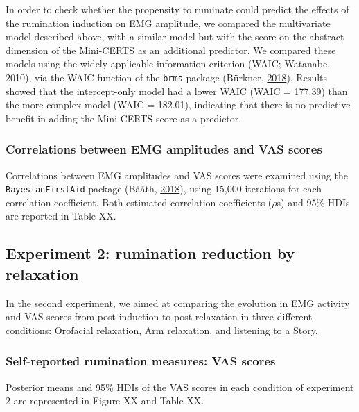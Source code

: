 \documentclass[a4paper,12pt,twoside,openright,oldfontcommands]{memoir}
\begin{document}
In order to check whether the propensity to ruminate could predict the effects of the rumination induction on EMG amplitude, we compared the multivariate model described above, with a similar model but with the score on the abstract dimension of the Mini-CERTS as an additional predictor. We compared these models using the widely applicable information criterion (WAIC; Watanabe, 2010), via the WAIC function of the \texttt{brms} package (Bürkner, \protect\hyperlink{ref-R-brms}{2018}). Results showed that the intercept-only model had a lower WAIC (WAIC = 177.39) than the more complex model (WAIC = 182.01), indicating that there is no predictive benefit in adding the Mini-CERTS score as a predictor.

\hypertarget{correlations-between-emg-amplitudes-and-vas-scores}{%
\subsubsection{Correlations between EMG amplitudes and VAS scores}\label{correlations-between-emg-amplitudes-and-vas-scores}}

Correlations between EMG amplitudes and VAS scores were examined using the \texttt{BayesianFirstAid} package (Bååth, \protect\hyperlink{ref-R-BayesianFirstAid}{2018}), using 15,000 iterations for each correlation coefficient. Both estimated correlation coefficients (\(\rho\)s) and 95\% HDIs are reported in Table XX.

\hypertarget{experiment-2-rumination-reduction-by-relaxation-1}{%
\subsection{Experiment 2: rumination reduction by relaxation}\label{experiment-2-rumination-reduction-by-relaxation-1}}

In the second experiment, we aimed at comparing the evolution in EMG activity and VAS scores from post-induction to post-relaxation in three different conditions: Orofacial relaxation, Arm relaxation, and listening to a Story.

\hypertarget{self-reported-rumination-measures-vas-scores-1}{%
\subsubsection{Self-reported rumination measures: VAS scores}\label{self-reported-rumination-measures-vas-scores-1}}

Posterior means and 95\% HDIs of the VAS scores in each condition of experiment 2 are represented in Figure XX and Table XX.
\end{document}

